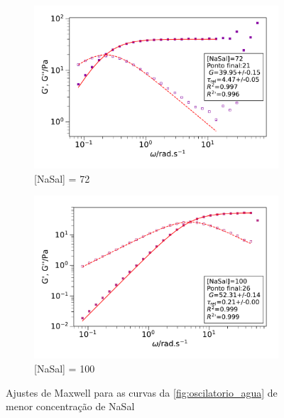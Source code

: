 \begin{figure}[h]
			\begin{subfigure}[t]{0.5\textwidth}
				\includegraphics[width=\textwidth]{imagens/reologia/oscilatorio_agua_72}
				\caption{[NaSal] = 72 \mM}
				\label{fig:oscilatorio_agua_72}
			\end{subfigure} %
			\begin{subfigure}[t]{0.5\textwidth}
				\includegraphics[width=\textwidth]{imagens/reologia/oscilatorio_agua_100}
				\caption{[NaSal] = 100 \mM}
				\label{fig:oscilatorio_agua_100}
			\end{subfigure}
		
		\caption{Ajustes de Maxwell para as curvas da \autoref{fig:oscilatorio_agua} de menor concentração de NaSal}
		\label{fig:oscilatorio_agua_maxwell1}
		\end{figure}
	
